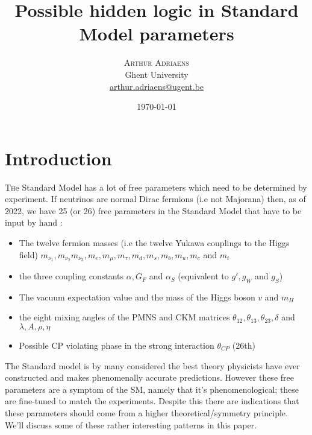 \documentclass[twoside,twocolumn,11pt]{article} %
\title{Possible hidden logic in Standard Model parameters} %
\author{%
\textsc{Arthur Adriaens} \\[1ex] %
\normalsize Ghent University \\ %
\normalsize \href{mailto:arthur.adriaens@ugent.be}{arthur.adriaens@ugent.be} %
}
\date{\today} %
\begin{document}
\maketitle


\section{Introduction}

\lettrine[nindent=0em,lines=3]{T} he Standard Model has a lot of free parameters which need to be determined by experiment. If neutrinos are normal Dirac fermions (i.e not Majorana) then, as of 2022, we have 25 (or 26) free parameters in the Standard Model that have to be input by hand \cite{Thomson}:
\begin{itemize}
	\item The twelve fermion masses (i.e the twelve Yukawa couplings to the Higgs field)
	$m_{\nu_1},m_{\nu_2}m_{\nu_3},m_e,m_\mu,m_\tau,m_d,m_s,m_b,m_u,m_c$ and $m_t$
	\item the three coupling constants $\alpha, G_F$ and $\alpha_S$ (equivalent to $ g',g_W$ and $g_S$)
	\item The vacuum expectation value and the mass of the Higgs boson $v$ and $m_H$
	\item the eight mixing angles of the PMNS and CKM matrices $\theta_{12},\theta_{13},\theta_{23},\delta$ and $\lambda,A,\rho,\eta$
	\item Possible CP violating phase in the strong interaction $\theta_{CP}$ (26th)
\end{itemize}

\noindent
The Standard model is by many considered the best theory physicists have ever constructed and makes phenomenally accurate predictions. However these free parameters are a symptom of the SM, namely that it's phenomenological; these are fine-tuned to match the experiments. Despite this there are indications that these parameters should come from a higher theoretical/symmetry principle. We'll discuss some of these rather interesting patterns in this paper.
\end{document}
